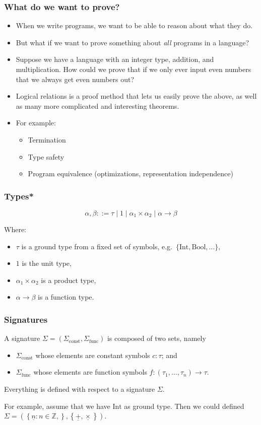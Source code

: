 \documentclass[aspectratio=169]{beamer}
\begin{document}
\begin{frame}
\frametitle{What do we want to prove?}

\begin{itemize}
    \item When we write programs, we want to be able to reason about what they do.
    \pause
    \item But what if we want to prove something about \emph{all} programs in a language?
    \pause
    \item Suppose we have a language with an integer type, addition, and multiplication.
    How could we prove that if we only ever input even numbers that we always get even numbers out?
    \pause
    \item Logical relations is a proof method that lets us easily prove the above, as well as many more complicated and interesting theorems.
    \pause
    \item For example:
    \begin{itemize}
        \item Termination
        \item Type safety
        \item Program equivalence (optimizations, representation independence)
    \end{itemize}
\end{itemize}
\end{frame}

\begin{frame}
\frametitle{Types*}
\[
\alpha, \beta ::= \tau \mid 1 \mid \alpha_1 \times \alpha_2 \mid \alpha \rightarrow \beta
\]

Where:
\begin{itemize}
    \item $\tau$ is a ground type from a fixed set of symbols, e.g.\ $\{\text{Int}, \text{Bool}, \ldots\},$
    \item $1$ is the unit type,
    \item $\alpha_1 \times \alpha_2$ is a product type,
    \item $\alpha \rightarrow \beta$ is a function type.
\end{itemize}
\end{frame}

\begin{frame}
\frametitle{Signatures}
A signature $\Sigma = (\Sigma_{\text{const}}, \Sigma_{\text{func}})$ is composed of two sets, namely
\begin{itemize}
    \item $\Sigma_{\text{const}}$ whose elements are constant symbols $c : \tau$; and
    \item $\Sigma_{\text{func}}$ whose elements are function symbols $f : (\tau_1, \ldots, \tau_n) \to \tau$.
\end{itemize}
Everything is defined with respect to a signature $\Sigma$.

\medskip

For example, assume that we have $\text{Int}$ as ground type.
Then we could defined $\Sigma = \left(\left\{\underline{n} : n \in \mathbb{Z},\right\}, \left\{\underline{+}, \underline{\times}\right\}\right)$. 

\end{frame}
\end{document}
